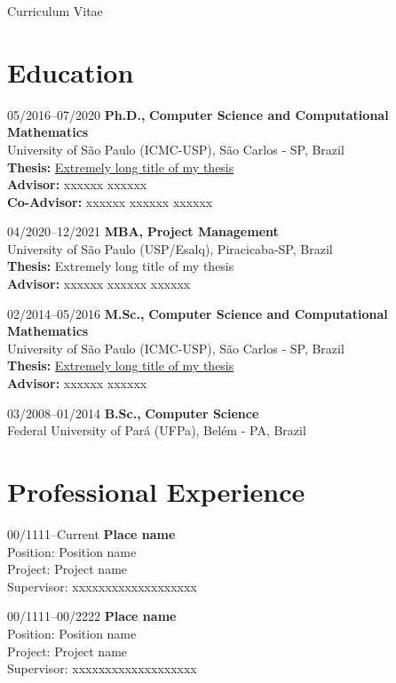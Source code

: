 \documentclass[11pt,a4paper]{article}
\begin{document}
\begin{cv}{Curriculum Vitae}
 \section{Education}
  \begin{cvlist}{}
  \item[05/2016--07/2020]
      \textbf{Ph.D.,} {{\textbf{Computer Science and Computational Mathematics}}}\\
      University of São Paulo ({ICMC-USP}), São Carlos - SP, Brazil\\
      \textbf{Thesis:} \href{https://www.teses.usp.br/teses/}{Extremely long title of my thesis}\\
      \textbf{Advisor:} {xxxxxx xxxxxx}\\
      \textbf{Co-Advisor:} {xxxxxx xxxxxx xxxxxx}
  \item[04/2020--12/2021]
      \textbf{MBA,} {{\textbf{Project Management}}}\\
      University of São Paulo ({USP/Esalq}), Piracicaba-SP, Brazil\\
      \textbf{Thesis:} Extremely long title of my thesis \\
      \textbf{Advisor:} {xxxxxx xxxxxx xxxxxx}
  \item[02/2014--05/2016]
      \textbf{M.Sc.,} {{\textbf{Computer Science and Computational Mathematics}}}\\
      University of São Paulo ({ICMC-USP}), São Carlos - SP, Brazil\\
      \textbf{Thesis:} \href{http://www.teses.usp.br/teses/disponiveis/en.php}{Extremely long title of my thesis}\\
      \textbf{Advisor:} {xxxxxx xxxxxx}
  \item[03/2008--01/2014]
      \textbf{B.Sc.,} {{\textbf{Computer Science}}}\\
      Federal University of Pará ({UFPa}), Belém - PA, Brazil
  \end{cvlist}
\section{Professional Experience}
  \begin{cvlist}{}
    \item[00/1111--Current]
      {\textbf{Place name}}\\
      {Position:} Position name\\
      {Project:} Project name\\
      {Supervisor:} {xxxxxxxxxxxxxxxxxxx}
    \item[00/1111--00/2222]
      {\textbf{Place name}}\\
      {Position:} Position name\\
      {Project:} Project name\\
      {Supervisor:} {xxxxxxxxxxxxxxxxxxx}
  \end{cvlist}


\end{cv}
\end{document}
